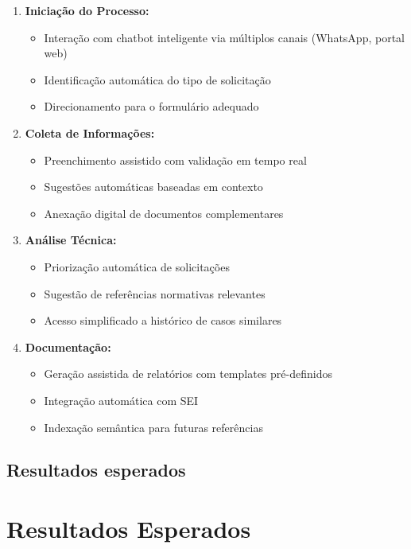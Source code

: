 \documentclass[12pt,a4paper]{article}
\begin{document}
\begin{enumerate}
    \item \textbf{Iniciação do Processo:}
    \begin{itemize}
        \item Interação com chatbot inteligente via múltiplos canais (WhatsApp, portal web)
        \item Identificação automática do tipo de solicitação
        \item Direcionamento para o formulário adequado
    \end{itemize}
    
    \item \textbf{Coleta de Informações:}
    \begin{itemize}
        \item Preenchimento assistido com validação em tempo real
        \item Sugestões automáticas baseadas em contexto
        \item Anexação digital de documentos complementares
    \end{itemize}
    
    \item \textbf{Análise Técnica:}
    \begin{itemize}
        \item Priorização automática de solicitações
        \item Sugestão de referências normativas relevantes
        \item Acesso simplificado a histórico de casos similares
    \end{itemize}
    
    \item \textbf{Documentação:}
    \begin{itemize}
        \item Geração assistida de relatórios com templates pré-definidos
        \item Integração automática com SEI
        \item Indexação semântica para futuras referências
    \end{itemize}
\end{enumerate}

\subsection{Resultados esperados}

\section{Resultados Esperados}
\end{document}
